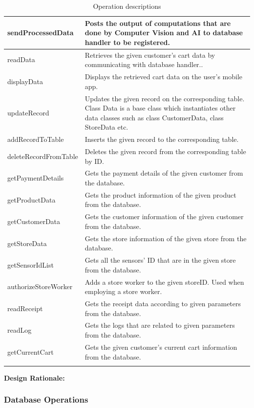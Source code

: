 \documentclass[11pt]{article}
\begin{document}
\begin{longtable}[H]{|p{5cm}|p{11cm}|}
        sendProcessedData & Posts the output of computations that are done by Computer Vision and AI to database handler to be registered.\\ \hline
        readData & Retrieves the given customer's cart data by communicating with database handler..\\ \hline
        displayData & Displays the retrieved cart data on the user's mobile app. \\ \hline
        updateRecord & Updates the given record on the corresponding table. Class Data is a base class which instantiates other data classes 
        such as class CustomerData, class StoreData etc.\\ \hline
        addRecordToTable & Inserts the given record to the corresponding table.\\ \hline
        deleteRecordFromTable & Deletes the given record from the corresponding table by ID.\\ \hline
        getPaymentDetails & Gets the payment details of the given customer from the database.  \\ \hline
        getProductData & Gets the product information of the given product from the database. \\ \hline
        getCustomerData & Gets the customer information of the given customer from the database. \\ \hline      
        getStoreData & Gets the store information of the given store from the database. \\ \hline
        getSensorIdList & Gets all the sensors' ID that are in the given store from the database. \\ \hline
        authorizeStoreWorker & Adds a store worker to the given storeID. Used when employing a store worker. \\ \hline
        readReceipt & Gets the receipt data according to given parameters from the database. \\ \hline
        readLog & Gets the logs that are related to given parameters from the database. \\ \hline
        getCurrentCart & Gets the given customer's current cart information from the database. \\ \hline  
    \caption{Operation descriptions}
    \label{oper_desc}
    \end{longtable}       

    \textbf{Design Rationale:\\}
    
    \subsubsection{Database Operations}
\end{document}

